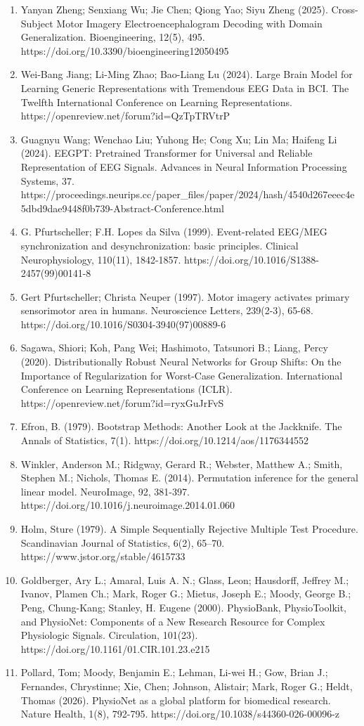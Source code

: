 \documentclass[11pt]{article}
\begin{document}
\begin{enumerate}
\item Yanyan Zheng; Senxiang Wu; Jie Chen; Qiong Yao; Siyu Zheng (2025). Cross-Subject Motor Imagery Electroencephalogram Decoding with Domain Generalization. Bioengineering, 12(5), 495. https://doi.org/10.3390/bioengineering12050495
\item Wei-Bang Jiang; Li-Ming Zhao; Bao-Liang Lu (2024). Large Brain Model for Learning Generic Representations with Tremendous EEG Data in BCI. The Twelfth International Conference on Learning Representations. https://openreview.net/forum?id=QzTpTRVtrP
\item Guagnyu Wang; Wenchao Liu; Yuhong He; Cong Xu; Lin Ma; Haifeng Li (2024). EEGPT: Pretrained Transformer for Universal and Reliable Representation of EEG Signals. Advances in Neural Information Processing Systems, 37. https://proceedings.neurips.cc/paper\_files/paper/2024/hash/4540d267eeec4e5dbd9dae9448f0b739-Abstract-Conference.html
\item G. Pfurtscheller; F.H. Lopes da Silva (1999). Event-related EEG/MEG synchronization and desynchronization: basic principles. Clinical Neurophysiology, 110(11), 1842-1857. https://doi.org/10.1016/S1388-2457(99)00141-8
\item Gert Pfurtscheller; Christa Neuper (1997). Motor imagery activates primary sensorimotor area in humans. Neuroscience Letters, 239(2-3), 65-68. https://doi.org/10.1016/S0304-3940(97)00889-6
\item Sagawa, Shiori; Koh, Pang Wei; Hashimoto, Tatsunori B.; Liang, Percy (2020). Distributionally Robust Neural Networks for Group Shifts: On the Importance of Regularization for Worst-Case Generalization. International Conference on Learning Representations (ICLR). https://openreview.net/forum?id=ryxGuJrFvS
\item Efron, B. (1979). Bootstrap Methods: Another Look at the Jackknife. The Annals of Statistics, 7(1). https://doi.org/10.1214/aos/1176344552
\item Winkler, Anderson M.; Ridgway, Gerard R.; Webster, Matthew A.; Smith, Stephen M.; Nichols, Thomas E. (2014). Permutation inference for the general linear model. NeuroImage, 92, 381-397. https://doi.org/10.1016/j.neuroimage.2014.01.060
\item Holm, Sture (1979). A Simple Sequentially Rejective Multiple Test Procedure. Scandinavian Journal of Statistics, 6(2), 65--70. https://www.jstor.org/stable/4615733
\item Goldberger, Ary L.; Amaral, Luis A. N.; Glass, Leon; Hausdorff, Jeffrey M.; Ivanov, Plamen Ch.; Mark, Roger G.; Mietus, Joseph E.; Moody, George B.; Peng, Chung-Kang; Stanley, H. Eugene (2000). PhysioBank, PhysioToolkit, and PhysioNet: Components of a New Research Resource for Complex Physiologic Signals. Circulation, 101(23). https://doi.org/10.1161/01.CIR.101.23.e215
\item Pollard, Tom; Moody, Benjamin E.; Lehman, Li-wei H.; Gow, Brian J.; Fernandes, Chrystinne; Xie, Chen; Johnson, Alistair; Mark, Roger G.; Heldt, Thomas (2026). PhysioNet as a global platform for biomedical research. Nature Health, 1(8), 792-795. https://doi.org/10.1038/s44360-026-00096-z
\end{enumerate}
\end{document}
